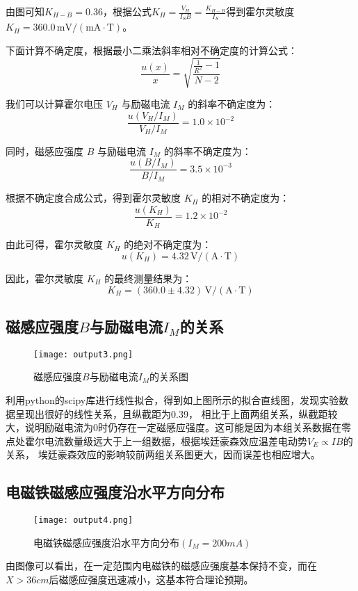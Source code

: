 \documentclass[UTF-8,twoside,cs4size]{ctexart}
\begin{document}
    由图可知$K_{H-B}=0.36$，根据公式$K_H = \frac{V_H}{I_S B}=\frac{K_{H-B}}{I_S}$得到霍尔灵敏度$K_H = 360.0\, \mathrm{mV/(mA\cdot T)}$。

    下面计算不确定度，根据最小二乘法斜率相对不确定度的计算公式：
    \[
    \frac{u(x)}{x} = \sqrt{\frac{\frac{1}{R^2} - 1}{N - 2}}
    \]
    
    我们可以计算霍尔电压 $V_H$ 与励磁电流 $I_M$ 的斜率不确定度为：
    \[
    \frac{u(V_H / I_M)}{V_H / I_M} = 1.0 \times 10^{-2}
    \]
    
    同时，磁感应强度 $B$ 与励磁电流 $I_M$ 的斜率不确定度为：
    \[
    \frac{u(B / I_M)}{B / I_M} = 3.5 \times 10^{-3}
    \]
    
    根据不确定度合成公式，得到霍尔灵敏度 $K_H$ 的相对不确定度为：
    \[
    \frac{u(K_H)}{K_H} = 1.2 \times 10^{-2}
    \]
    
    由此可得，霍尔灵敏度 $K_H$ 的绝对不确定度为：
    \[
    u(K_H) = 4.32 \, \mathrm{V/(A \cdot T)}
    \]
    
    因此，霍尔灵敏度 $K_H$ 的最终测量结果为：
    \[
    K_H = (360.0 \pm 4.32) \, \mathrm{V/(A \cdot T)}
    \]

\subsection{磁感应强度$B$与励磁电流$I_M$的关系}
    \begin{figure}[!h]
        \centering
        \texttt{[image: output3.png]}
        \caption{磁感应强度$B$与励磁电流$I_M$的关系图}
    \end{figure}
    利用python的scipy库进行线性拟合，得到如上图所示的拟合直线图，发现实验数据呈现出很好的线性关系，且纵截距为0.39，
    相比于上面两组关系，纵截距较大，说明励磁电流为0时仍存在一定磁感应强度。这可能是因为本组关系数据在零点处霍尔电流数量级远大于上一组数据，根据埃廷豪森效应温差电动势$V_E\propto{IB}$的关系，
    埃廷豪森效应的影响较前两组关系图更大，因而误差也相应增大。

\subsection{电磁铁磁感应强度沿水平方向分布}
    \begin{figure}[!h]
        \centering
        \texttt{[image: output4.png]}
        \caption{电磁铁磁感应强度沿水平方向分布$(I_M=200mA)$}
    \end{figure}
    由图像可以看出，在一定范围内电磁铁的磁感应强度基本保持不变，而在$X>36cm$后磁感应强度迅速减小，这基本符合理论预期。
\end{document}
